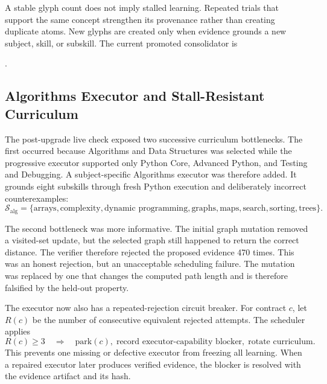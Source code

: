 A stable glyph count does not imply stalled learning.  Repeated trials that
support the same concept strengthen its provenance rather than creating
duplicate atoms.  New glyphs are created only when evidence grounds a new
subject, skill, or subskill.  The current promoted consolidator is
\begin{center}
\small{}.
\end{center}

\subsection{Algorithms Executor and Stall-Resistant Curriculum}
\label{subsec:aion-algorithms-stall-recovery}

The post-upgrade live check exposed two successive curriculum bottlenecks.  The
first occurred because Algorithms and Data Structures was selected while the
progressive executor supported only Python Core, Advanced Python, and Testing
and Debugging.  A subject-specific Algorithms executor was therefore added.
It grounds eight subskills through fresh Python execution and deliberately
incorrect counterexamples:
\begin{equation}
\mathcal{S}_{\mathrm{alg}}=\{
\text{arrays},\text{complexity},\text{dynamic programming},\text{graphs},
\text{maps},\text{search},\text{sorting},\text{trees}\}.
\end{equation}

The second bottleneck was more informative.  The initial graph mutation
removed a visited-set update, but the selected graph still happened to return
the correct distance.  The verifier therefore rejected the proposed evidence
470 times.  This was an honest rejection, but an unacceptable scheduling
failure.  The mutation was replaced by one that changes the computed path
length and is therefore falsified by the held-out property.

The executor now also has a repeated-rejection circuit breaker.  For contract
$c$, let $R(c)$ be the number of consecutive equivalent rejected attempts.
The scheduler applies
\begin{equation}
R(c)\geq 3
\quad\Longrightarrow\quad
\text{park}(c),\;
\text{record executor-capability blocker},\;
\text{rotate curriculum}.
\label{eq:aion-three-strike-executor}
\end{equation}
This prevents one missing or defective executor from freezing all learning.
When a repaired executor later produces verified evidence, the blocker is
resolved with the evidence artifact and its hash.


